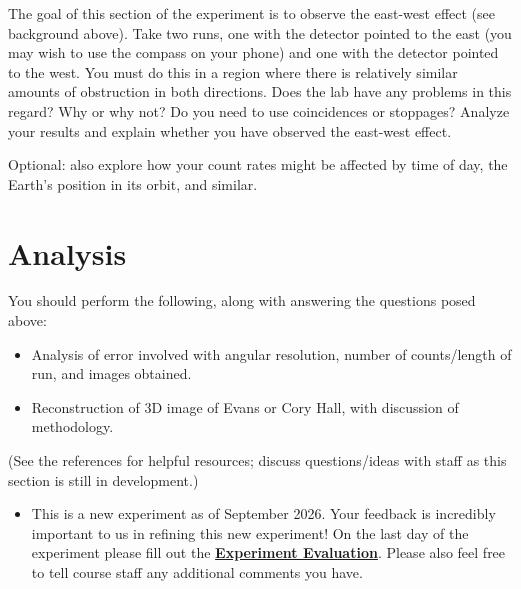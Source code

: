 \documentclass{../lab}
\begin{document}
The goal of this section of the experiment is to observe the east-west effect (see background above). Take two runs, one with the detector pointed to the east (you may wish to use the compass on your phone) and one with the detector pointed to the west. You must do this in a region where there is relatively similar amounts of obstruction in both directions. Does the lab have any problems in this regard? Why or why not? Do you need to use coincidences or stoppages? Analyze your results and explain whether you have observed the east-west effect.

Optional: also explore how your count rates might be affected by time of day, the Earth's position in its orbit, and similar.

\section{Analysis}

You should perform the following, along with answering the questions posed above:

\begin{itemize}
    \item Analysis of error involved with angular resolution, number of counts/length of run, and images obtained.
    \item Reconstruction of 3D image of Evans or Cory Hall, with discussion of methodology.
\end{itemize}

(See the references for helpful resources; discuss questions/ideas with staff as this section is still in development.)

\begin{itemize}
    \item This is a new experiment as of September 2026. Your feedback is incredibly important to us in refining this new experiment! On the last day of the experiment please fill out the \href{\ExperimentEvaluation}{\textbf{Experiment Evaluation}}. Please also feel free to tell course staff any additional comments you have.
\end{itemize}
\end{document}

